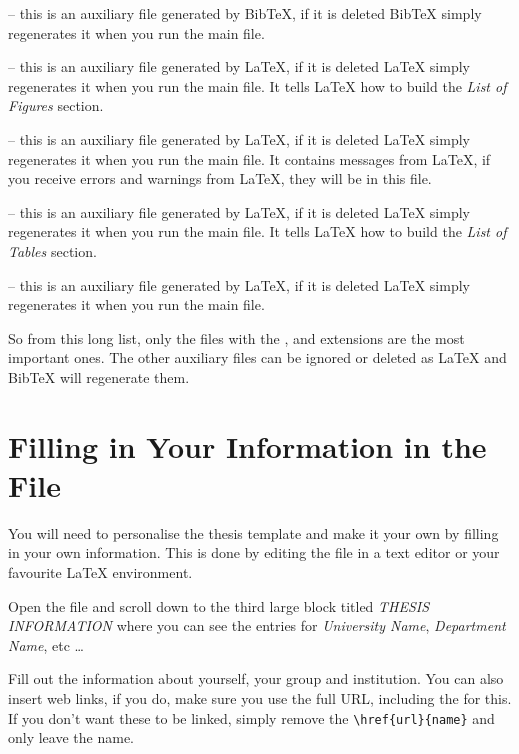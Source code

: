\documentclass[
12pt, %
english, %
doublespacing, %
nolistspacing, %
liststotoc, %
headsepline, %
chapterinoneline, %
openany, %
]{DoctoralThesis}\usepackage[]{graphicx}\usepackage[]{color}
\begin{document}
 -- this is an auxiliary file generated by BibTeX, if it is deleted BibTeX simply regenerates it when you run the main  file.

 -- this is an auxiliary file generated by \LaTeX{}, if it is deleted \LaTeX{} simply regenerates it when you run the main  file. It tells \LaTeX{} how to build the \emph{List of Figures} section.

 -- this is an auxiliary file generated by \LaTeX{}, if it is deleted \LaTeX{} simply regenerates it when you run the main  file. It contains messages from \LaTeX{}, if you receive errors and warnings from \LaTeX{}, they will be in this  file.

 -- this is an auxiliary file generated by \LaTeX{}, if it is deleted \LaTeX{} simply regenerates it when you run the main  file. It tells \LaTeX{} how to build the \emph{List of Tables} section.

 -- this is an auxiliary file generated by \LaTeX{}, if it is deleted \LaTeX{} simply regenerates it when you run the main  file.

So from this long list, only the files with the ,  and  extensions are the most important ones. The other auxiliary files can be ignored or deleted as \LaTeX{} and BibTeX will regenerate them.


\section{Filling in Your Information in the  File}\label{FillingFile}

You will need to personalise the thesis template and make it your own by filling in your own information. This is done by editing the  file in a text editor or your favourite LaTeX environment.

Open the file and scroll down to the third large block titled \emph{THESIS INFORMATION} where you can see the entries for \emph{University Name}, \emph{Department Name}, etc \ldots

Fill out the information about yourself, your group and institution. You can also insert web links, if you do, make sure you use the full URL, including the  for this. If you don't want these to be linked, simply remove the \verb|\href{url}{name}| and only leave the name.
\end{document}
